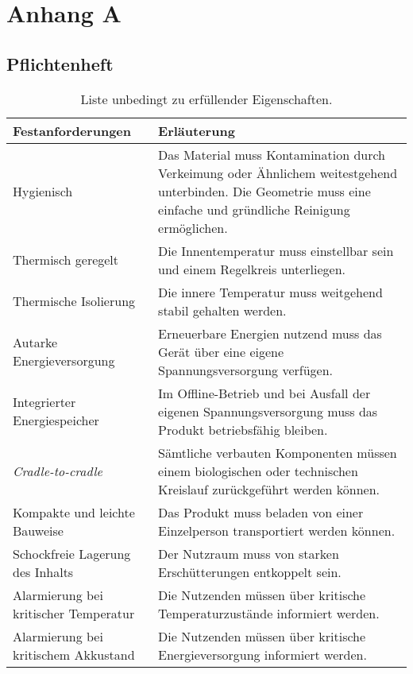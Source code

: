 \chapter{Anhang A}
	\section{Pflichtenheft}
		\begin{table}[h]
			\centering
			\caption{Liste unbedingt zu erfüllender Eigenschaften.}
			\begin{tabular}{@{}p{.5\textwidth}p{}@{}}
				\toprule
				\textbf{Festanforderungen} 						& \textbf{Erläuterung} \\
				\midrule
				Hygienisch										& Das Material muss Kontamination durch Verkeimung
				oder Ähnlichem weitestgehend unterbinden. Die Geometrie muss eine einfache und gründliche Reinigung ermöglichen.\\
				Thermisch geregelt								& Die Innentemperatur muss einstellbar sein und einem Regelkreis unterliegen.\\
				Thermische Isolierung							& Die innere Temperatur muss weitgehend stabil gehalten werden. \\
				Autarke Energieversorgung						& Erneuerbare Energien nutzend muss das Gerät über eine eigene Spannungsversorgung verfügen.\\
				Integrierter Energiespeicher					& Im Offline-Betrieb und bei Ausfall der eigenen Spannungsversorgung muss das Produkt betriebsfähig bleiben.\\
				\textit{Cradle-to-cradle}						& Sämtliche verbauten Komponenten müssen einem biologischen oder technischen Kreislauf zurückgeführt werden können.\\
				Kompakte und leichte Bauweise 					& Das Produkt muss beladen von einer Einzelperson transportiert werden können.\\
				Schockfreie Lagerung des Inhalts 				& Der Nutzraum muss von starken Erschütterungen entkoppelt sein.\\
				Alarmierung bei kritischer Temperatur			& Die Nutzenden müssen über kritische Temperaturzustände informiert werden.\\
				Alarmierung bei kritischem Akkustand			& Die Nutzenden müssen über kritische Energieversorgung informiert werden.\\
				\bottomrule
			\end{tabular}
		\end{table}

